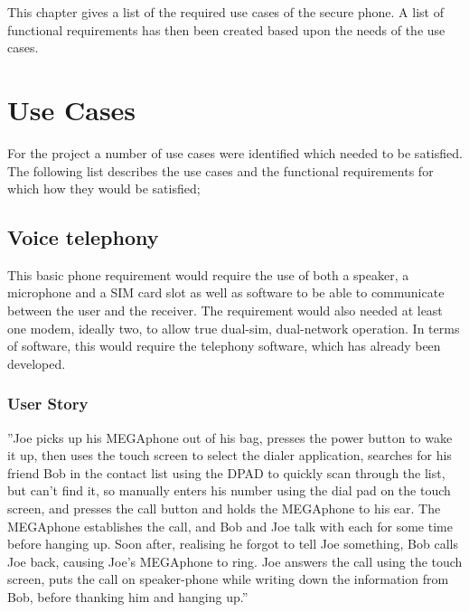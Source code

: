 This chapter gives a list of the required use cases of the secure phone. A list of functional requirements has then been created based upon the needs of the use cases. 

\section{Use Cases}

	For the project a number of use cases were identified which needed to be satisfied. The following list describes the use cases and the functional requirements for which how they would be satisfied;

\subsection{Voice telephony}
	This basic phone requirement would require the use of both a speaker, a microphone and a SIM card slot as well as software to be able to communicate between the user and the receiver. The requirement would also needed at least one modem, ideally two, to allow true dual-sim, dual-network operation. In terms of software, this would require the telephony software, which has already been developed.\\

        \subsubsection{User Story}
        ''Joe picks up his MEGAphone out of his bag, presses the power button to wake it up, then uses the touch screen to select the dialer application, searches for his friend Bob in the contact list using the DPAD to quickly scan through the list, but can't find it, so manually enters his number using the dial pad on the touch screen, and presses the call button and holds the MEGAphone to his ear.  The MEGAphone establishes the call, and Bob and Joe talk with each for some time before hanging up.  Soon after, realising he forgot to tell Joe something, Bob calls Joe back, causing Joe's MEGAphone to ring.  Joe answers the call using the touch screen, puts the call on speaker-phone while writing down the information from Bob, before thanking him and hanging up.''

